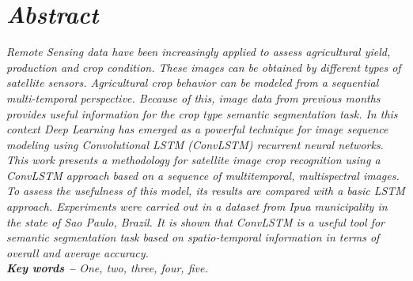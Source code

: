 
 
\section*{\textit {Abstract}} %


\hspace{-1.5mm}\textit{ %
Remote Sensing  data have been increasingly applied to assess agricultural yield, production and crop condition. These images can be obtained by different types of satellite sensors. Agricultural crop behavior can be modeled from a sequential multi-temporal perspective. Because of this, image data from previous months provides useful information for the crop type semantic segmentation task. In this context Deep Learning has emerged as a powerful technique for image sequence modeling using Convolutional LSTM (ConvLSTM) recurrent neural networks. This work presents a methodology for satellite image crop recognition using a ConvLSTM approach based on a sequence of multitemporal, multispectral images. To assess the usefulness of this model, its results are compared with a basic LSTM approach. Experiments were carried out in a dataset from Ipua municipality in the state of Sao Paulo, Brazil. It is shown that ConvLSTM is a useful tool for semantic segmentation task based on spatio-temporal information in terms of overall and average accuracy.
}
\\

\textit{\textbf{Key words --} %
One, two, three, four, five. %
}

